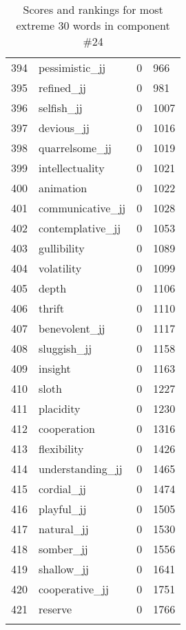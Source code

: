 \begin{longtable}[!htbp]{| rlr@{.}l |}
    394 & pessimistic\_jj & 0 & 966 \\
    395 & refined\_jj & 0 & 981 \\
    396 & selfish\_jj & 0 & 1007 \\
    397 & devious\_jj & 0 & 1016 \\
    398 & quarrelsome\_jj & 0 & 1019 \\
    399 & intellectuality & 0 & 1021 \\
    400 & animation & 0 & 1022 \\
    401 & communicative\_jj & 0 & 1028 \\
    402 & contemplative\_jj & 0 & 1053 \\
    403 & gullibility & 0 & 1089 \\
    404 & volatility & 0 & 1099 \\
    405 & depth & 0 & 1106 \\
    406 & thrift & 0 & 1110 \\
    407 & benevolent\_jj & 0 & 1117 \\
    408 & sluggish\_jj & 0 & 1158 \\
    409 & insight & 0 & 1163 \\
    410 & sloth & 0 & 1227 \\
    411 & placidity & 0 & 1230 \\
    412 & cooperation & 0 & 1316 \\
    413 & flexibility & 0 & 1426 \\
    414 & understanding\_jj & 0 & 1465 \\
    415 & cordial\_jj & 0 & 1474 \\
    416 & playful\_jj & 0 & 1505 \\
    417 & natural\_jj & 0 & 1530 \\
    418 & somber\_jj & 0 & 1556 \\
    419 & shallow\_jj & 0 & 1641 \\
    420 & cooperative\_jj & 0 & 1751 \\
    421 & reserve & 0 & 1766 \\
    \hline
    \caption{Scores and rankings for most extreme 30 words in component \#24} \\
\end{longtable}

